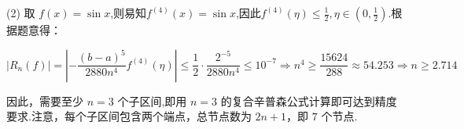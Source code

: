\begin{tcolorbox}
(2) 取 $f(x)=\sin x$,则易知$f^{(4)}(x)=\sin x$,因此$f^{(4)}(\eta)\leqslant \frac 12,\eta \in(0,\frac 12)$.根据题意得：

$$ \left|R_n\left(f\right)\right|=\left|-\frac{(b-a)^{5}}{2880 n^{4}} f^{(4)}(\eta)\right| \leqslant \frac 12\cdot\frac{2^{-5}}{2880 n^{4}}  \leqslant  10^{-7} \Rightarrow n^4\geqslant \frac{15624}{288}\approx 54.253\Rightarrow n\geqslant 2.714$$


因此，需要至少 $n=3$ 个子区间,即用 $ n=3 $ 的复合辛普森公式计算即可达到精度要求.注意，每个子区间包含两个端点，总节点数为 $2n+1$，即 $7$ 个节点.

  \end{tcolorbox}


  